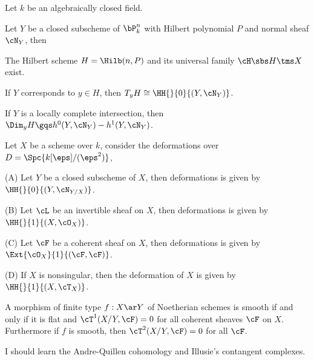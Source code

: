 \documentclass[a4paper, twoside]{article}
\begin{document}
\begin{stp}
	Let $k$ be an algebraically closed field.
\end{stp}

\begin{thm}
	Let $Y$ be a closed subscheme of $\bP_{k}^{n}$ with Hilbert polynomial $P$ and normal sheaf $\cN_{Y}$, then
	\begin{itm}
		\item The Hilbert scheme $H=\Hilb(n,P)$ and its universal family $\cH\sbs H\tms X$ exist.
		\item If $Y$ corresponds to $y\in H$, then $T_{y}H\cong\HH{}{0}{(Y,\cN_{Y})}$.
		\item If $Y$ is a locally complete intersection, then $\Dim_{y}H\gqs h^{0}(Y,\cN_{Y})-h^{1}(Y,\cN_{Y})$.
	\end{itm}
\end{thm}

\begin{thm}
	Let $X$ be a scheme over $k$, consider the deformations over $D=\Spc{k[\eps]/(\eps^{2})}$,
	\begin{enr}
		\item (A) {\cite[Theorem~2.4]{Hartshorne2010}} Let $Y$ be a closed subscheme of $X$, then deformations is given by $\HH{}{0}{(Y,\cN_{Y/X})}$.
		\item (B) {\cite[Proposition~2.6]{Hartshorne2010}} Let $\cL$ be an invertible sheaf on $X$, then deformations is given by $\HH{}{1}{(X,\cO_{X})}$.
		\item (C) {\cite[Theorem~2.7]{Hartshorne2010}} Let $\cF$ be a coherent sheaf on $X$, then deformations is given by $\Ext{\cO_{X}}{1}{(\cF,\cF)}$.
		\item (D) {\cite[Theorem~5.3]{Hartshorne2010}} If $X$ is nonsingular, then the deformation of $X$ is given by $\HH{}{1}{(X,\cT_{X})}$.
	\end{enr}
\end{thm}

\begin{thm}
	A morphism of finite type $f:X\ar Y$ of Noetherian schemes is smooth if and only if it is flat and $\cT^{1}(X/Y,\cF)=0$ for all coherent sheaves $\cF$ on $X$. Furthermore if $f$ is smooth, then $\cT^{2}(X/Y,\cF)=0$ for all $\cF$.
\end{thm}

\begin{rmk}
	I should learn the Andre-Quillen cohomology and Illusie's contangent complexes.
\end{rmk}
\end{document}
